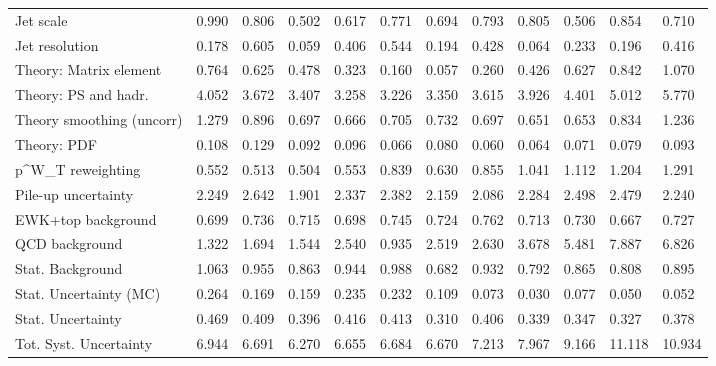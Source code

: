 \begin{tabular}{l|p{0.6cm}p{0.6cm}p{0.6cm}p{0.6cm}p{0.6cm}p{0.6cm}p{0.6cm}p{0.6cm}p{0.6cm}p{0.6cm}p{0.6cm}}
Jet scale                                & 0.990 & 0.806 & 0.502 & 0.617 & 0.771 & 0.694 & 0.793 & 0.805 & 0.506 & 0.854 & 0.710 \\
Jet resolution                           & 0.178 & 0.605 & 0.059 & 0.406 & 0.544 & 0.194 & 0.428 & 0.064 & 0.233 & 0.196 & 0.416 \\
Theory: Matrix element                   & 0.764 & 0.625 & 0.478 & 0.323 & 0.160 & 0.057 & 0.260 & 0.426 & 0.627 & 0.842 & 1.070 \\
Theory: PS and hadr.                     & 4.052 & 3.672 & 3.407 & 3.258 & 3.226 & 3.350 & 3.615 & 3.926 & 4.401 & 5.012 & 5.770 \\
Theory smoothing (uncorr)                & 1.279 & 0.896 & 0.697 & 0.666 & 0.705 & 0.732 & 0.697 & 0.651 & 0.653 & 0.834 & 1.236 \\
Theory: PDF                              & 0.108 & 0.129 & 0.092 & 0.096 & 0.066 & 0.080 & 0.060 & 0.064 & 0.071 & 0.079 & 0.093 \\
p^{W}_{T} reweighting                    & 0.552 & 0.513 & 0.504 & 0.553 & 0.839 & 0.630 & 0.855 & 1.041 & 1.112 & 1.204 & 1.291 \\
Pile-up uncertainty                      & 2.249 & 2.642 & 1.901 & 2.337 & 2.382 & 2.159 & 2.086 & 2.284 & 2.498 & 2.479 & 2.240 \\
EWK+top background                       & 0.699 & 0.736 & 0.715 & 0.698 & 0.745 & 0.724 & 0.762 & 0.713 & 0.730 & 0.667 & 0.727 \\
QCD background                           & 1.322 & 1.694 & 1.544 & 2.540 & 0.935 & 2.519 & 2.630 & 3.678 & 5.481 & 7.887 & 6.826 \\
Stat. Background                         & 1.063 & 0.955 & 0.863 & 0.944 & 0.988 & 0.682 & 0.932 & 0.792 & 0.865 & 0.808 & 0.895 \\
Stat. Uncertainty (MC)                   & 0.264 & 0.169 & 0.159 & 0.235 & 0.232 & 0.109 & 0.073 & 0.030 & 0.077 & 0.050 & 0.052 \\
\hline
Stat. Uncertainty                        & 0.469 & 0.409 & 0.396 & 0.416 & 0.413 & 0.310 & 0.406 & 0.339 & 0.347 & 0.327 & 0.378 \\
\hline
Tot. Syst. Uncertainty                   & 6.944 & 6.691 & 6.270 & 6.655 & 6.684 & 6.670 & 7.213 & 7.967 & 9.166 & 11.118 & 10.934 \\
\hline
\end{tabular}
